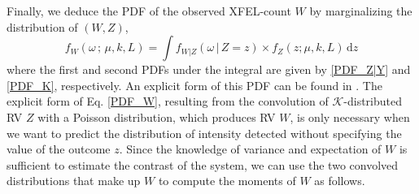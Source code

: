 \documentclass[11pt]{article}
\theoremstyle{definition}
\begin{document}
%
Finally, we deduce the PDF of the observed XFEL-count $W$ by marginalizing the distribution of $(W,Z)$,  
%
\begin{equation}
f_W (\omega\, ;\, \mu,k,L) = \int f_{W|Z}(\omega\,|\,Z=z) \times f_Z(z;\mu,k,L)\, \text{d}z
\label{PDF_W}
\end{equation}
%
where the first and second PDFs under the integral are given by \eqref{PDF_Z|Y} and \eqref{PDF_K}, respectively.
An explicit form of this PDF can be found in \cite[Eq.~(4.3)]{Teich:89}. The explicit form of Eq. \eqref{PDF_W}, resulting from the convolution of \(\mathcal{K}\)-distributed RV \(Z\) with a Poisson distribution, which produces RV \(W\), is only necessary when we want to predict the distribution of intensity detected without specifying the value of the outcome \(z\). Since the knowledge of variance and expectation of \(W\) is sufficient to estimate the contrast of the system, we can use the two convolved distributions that make up \(W\) to compute the moments of \(W\) as follows.
\end{document}
